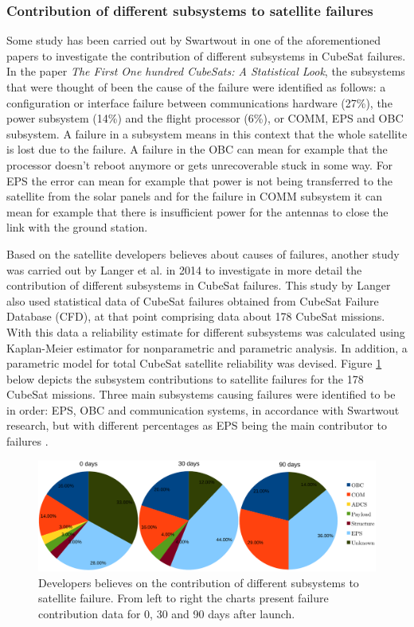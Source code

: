 \documentclass[english,12pt,a4paper,pdftex,elec,utf8]{aaltothesis}
\begin{document}
\subsubsection{Contribution of different subsystems to satellite failures}
Some study has been carried out by Swartwout in one of the aforementioned papers to investigate the contribution of different subsystems in CubeSat failures. In the paper \textit{The First One hundred CubeSats: A Statistical Look}, the subsystems that were thought of been the cause of the failure were identified as follows: a configuration or interface failure between communications hardware (27\%), the power subsystem (14\%) and the flight processor (6\%), or COMM, EPS and OBC subsystem. A failure in a subsystem means in this context that the whole satellite is lost due to the failure. A failure in the OBC can mean for example that the processor doesn't reboot anymore or gets unrecoverable stuck in some way. For EPS the error can mean for example that power is not being transferred to the satellite from the solar panels and for the failure in COMM subsystem it can mean for example that there is insufficient power for the antennas to close the link with the ground station.  \cite{Swart1}\par
Based on the satellite developers believes about causes of failures, another study was carried out by Langer et al. in 2014 \cite{Langer} to investigate in more detail the contribution of different subsystems in CubeSat failures. This study by Langer also used statistical data of CubeSat failures obtained from CubeSat Failure Database (CFD), at that point comprising data about 178 CubeSat missions. With this data a reliability estimate for different subsystems was calculated using Kaplan-Meier estimator for nonparametric and parametric analysis. In addition, a parametric model for total CubeSat satellite reliability was devised. Figure \ref{subsystemfailures} below depicts the subsystem contributions to satellite failures for the 178 CubeSat missions. Three main subsystems causing failures were identified to be in order: EPS, OBC and communication systems, in accordance with Swartwout research, but with different percentages as EPS being the main contributor to failures \cite{Swart1, Langer}. \par
\begin{figure}[h!]
\centering
\includegraphics[scale=0.5]{subsystemmerge}
\caption{Developers believes on the contribution of different subsystems to satellite failure. From left to right the charts present failure contribution data for 0, 30 and 90 days after launch. \cite{Langer}}
\label{subsystemfailures}
\end{figure}  
\end{document}
